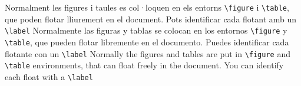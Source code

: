 \ifcase\doclanguage
\or
  Normalment les figures i taules es col·loquen en els entorns \verb|\figure| i \verb|\table|, que poden flotar lliurement en el document. Pots identificar cada flotant amb un \verb|\label|
\or
  Normalmente las figuras y tablas se colocan en los entornos \verb|\figure| y \verb|\table|, que pueden flotar libremente en el documento. Puedes identificar cada flotante con un \verb|\label|
\else
  Normally the figures and tables are put in \verb|\figure| and \verb|\table| environments, that can float freely in the document. You can identify each float with a \verb|\label|
\fi

